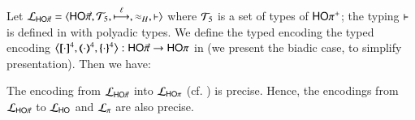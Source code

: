 Let $\tyl{L}_{\PHOp}=\calc{\PHOp}{{\cal{T}}_5}{\hby{\ell}}{\wb_H}{\proves}$
where 
${\cal{T}}_5$ is a set of types of $\mathsf{HO\pi^{+}}$;  
the typing $\vdash$ is defined in 
 with polyadic types. 
We define the typed encoding 
the typed encoding $\enco{\map{\cdot}^{4}, \mapt{\cdot}^{4}, \mapa{\cdot}^{4}}: \PHOp \to \HOp$ 
in  (we present the biadic case, to simplify presentation).
Then we have:

\smallskip 

\begin{theorem}
\label{f:enc:phopiptohopi}
The encoding from $\mathcal{L}_{\mathsf{HO}{\vec{\pi}}}$ into $\mathcal{L}_{\mathsf{HO}\pi}$ (cf. )
is precise. 
Hence, the encodings 
from $\mathcal{L}_{\mathsf{HO}{\vec{\pi}}}$ to 
$\mathcal{L}_{\mathsf{HO}}$ 
and $\mathcal{L}_{\pi}$ 
are also precise. 
\end{theorem}

